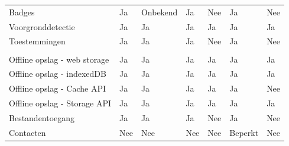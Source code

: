\begin{table}[H]
\begin{tabular}{p{6cm}p{13mm}p{15mm}p{13mm}p{13mm}p{13mm}p{13mm}}
				   Badges & \cellcolor{green!40} Ja  & \cellcolor{orange!50} Onbekend & \cellcolor{green!40} Ja & \cellcolor{red!50} Nee  & \cellcolor{green!40} Ja & \cellcolor{red!50} Nee \\
				   
				   Voorgronddetectie & \cellcolor{green!40} Ja  & \cellcolor{green!40} Ja & \cellcolor{green!40} Ja  & \cellcolor{green!40} Ja & \cellcolor{green!40} Ja & \cellcolor{green!40} Ja \\
				   
				   Toestemmingen & \cellcolor{green!40} Ja  & \cellcolor{green!40} Ja & \cellcolor{green!40} Ja & \cellcolor{red!50} Nee  & \cellcolor{green!40} Ja & \cellcolor{red!50} Nee \\
				   
				   &  & &  &  &  &  \\
				   
				   Offline opslag - web storage & \cellcolor{green!40} Ja  & \cellcolor{green!40} Ja & \cellcolor{green!40} Ja  & \cellcolor{green!40} Ja & \cellcolor{green!40} Ja & \cellcolor{green!40} Ja \\
				   
				   Offline opslag - indexedDB & \cellcolor{green!40} Ja  & \cellcolor{green!40} Ja & \cellcolor{green!40} Ja  & \cellcolor{green!40} Ja & \cellcolor{green!40} Ja & \cellcolor{green!40} Ja \\
				   
				   Offline opslag - Cache API & \cellcolor{green!40} Ja  & \cellcolor{green!40} Ja & \cellcolor{green!40} Ja  & \cellcolor{green!40} Ja & \cellcolor{green!40} Ja & \cellcolor{red!50} Nee\\
				   
				   Offline opslag - Storage API & \cellcolor{green!40} Ja  & \cellcolor{green!40} Ja & \cellcolor{green!40} Ja  & \cellcolor{green!40} Ja & \cellcolor{green!40} Ja & \cellcolor{green!40} Ja \\
				   
				   Bestandentoegang & \cellcolor{green!40} Ja  & \cellcolor{green!40} Ja & \cellcolor{green!40} Ja & \cellcolor{red!50} Nee  & \cellcolor{green!40} Ja & \cellcolor{red!50} Nee \\
				   
				   Contacten &  \cellcolor{red!50} Nee  &  \cellcolor{red!50} Nee &  \cellcolor{red!50} Nee  & \cellcolor{red!50} Nee &  \cellcolor{orange!50} Beperkt &  \cellcolor{red!50} Nee \\
				   

\end{tabular}
\end{table}
